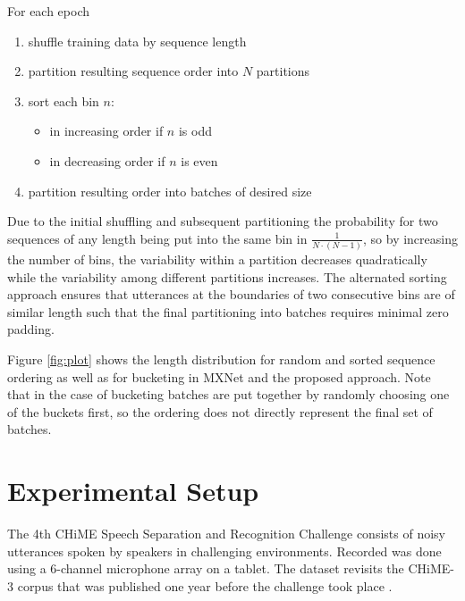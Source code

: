 \documentclass{article}
\begin{document}
 \begin{minipage}{\textwidth}
 	For each epoch
 	\begin{enumerate}
 		\item shuffle training data by sequence length
 		\item partition resulting sequence order into $N$ partitions
 		\item sort each bin $n$:
 		\begin{itemize}
 			\item in increasing order if $n$ is odd
 			\item in decreasing order if $n$ is even
 		\end{itemize}
 		\item partition resulting order into batches of desired size \\[1ex]
 	\end{enumerate}
 \end{minipage}

 Due to the initial shuffling and subsequent partitioning the probability for two sequences of any length being 
 put into the same bin in $\frac{1}{N\cdot(N-1)}$, so by increasing the number of bins, the variability within a 
 partition decreases quadratically while the variability among different partitions increases. The alternated
 sorting approach ensures that utterances at the boundaries of two consecutive bins are of similar length such 
 that the final partitioning into batches requires minimal zero padding.
 
 Figure \ref{fig:plot} shows the length distribution for random and sorted sequence ordering as well as for bucketing in MXNet and the proposed approach. Note that in the case of bucketing batches are put
 together by randomly choosing one of the buckets first, so the ordering does not directly represent 
 the final set of batches.

  \section{Experimental Setup} \label{sec:setup}
  The 4th CHiME Speech Separation and Recognition Challenge
  \cite{Vincent_CSL2016:CHiME4} consists of noisy utterances spoken by speakers in challenging 
  environments. Recorded was done using a 6-channel microphone array on a tablet. The dataset revisits 
  the CHiME-3 corpus that was published one year before the challenge took place \cite{Barker2015:CHiME3}.
  
\end{document}
